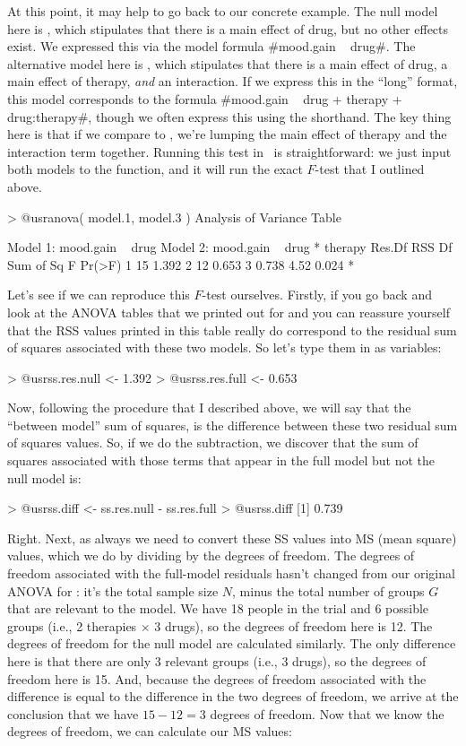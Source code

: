 

At this point, it may help to go back to our concrete example. The null model here is , which stipulates that there is a main effect of drug, but no other effects exist. We expressed this via the model formula \rtextverb#mood.gain ~ drug#. The alternative model here is , which stipulates that there is a main effect of drug, a main effect of therapy, {\it and} an interaction. If we express this in the ``long'' format, this model corresponds to the formula \rtextverb#mood.gain ~ drug + therapy + drug:therapy#, though we often express this using the \rtext{*} shorthand. The key thing here is that if we compare  to , we're lumping the main effect of therapy and the interaction term together. Running this test in \R\ is straightforward: we just input both models to the  function, and it will run the exact $F$-test that I outlined above.
\begin{rblock1}
> @usr{anova( model.1, model.3 )}
Analysis of Variance Table

Model 1: mood.gain ~ drug
Model 2: mood.gain ~ drug * therapy
  Res.Df   RSS Df Sum of Sq    F Pr(>F)  
1     15 1.392                           
2     12 0.653  3     0.738 4.52  0.024 *
\end{rblock1}
Let's see if we can reproduce this $F$-test ourselves. Firstly, if you go back and look at the ANOVA tables that we printed out for  and  you can reassure yourself that the RSS values printed in this table really do correspond to the residual sum of squares associated with these two models. So let's type them in as variables:
\begin{rblock1}
> @usr{ss.res.null <- 1.392}
> @usr{ss.res.full <- 0.653}
\end{rblock1}
Now, following the procedure that I described above, we will say that the ``between model'' sum of squares, is the difference between these two residual sum of squares values. So, if we do the subtraction, we discover that the sum of squares associated with those terms that appear in the full model but not the null model is:
\begin{rblock1} 
> @usr{ss.diff <- ss.res.null - ss.res.full} 
> @usr{ss.diff}
[1] 0.739
\end{rblock1}
Right. Next, as always we need to convert these SS values into MS (mean square) values, which we do by dividing by the degrees of freedom. The degrees of freedom associated with the full-model residuals hasn't changed from our original ANOVA for : it's the total sample size $N$, minus the total number of groups $G$ that are relevant to the model. We have 18 people in the trial and 6 possible groups (i.e., 2 therapies $\times$ 3 drugs), so the degrees of freedom here is 12. The degrees of freedom for the null model are calculated similarly. The only difference here is that there are only 3 relevant groups (i.e., 3 drugs), so the degrees of freedom here is 15. And, because the degrees of freedom associated with the difference is equal to the difference in the two degrees of freedom, we arrive at the conclusion that we have $15-12 = 3$ degrees of freedom. Now that we know the degrees of freedom, we can calculate our MS values:
